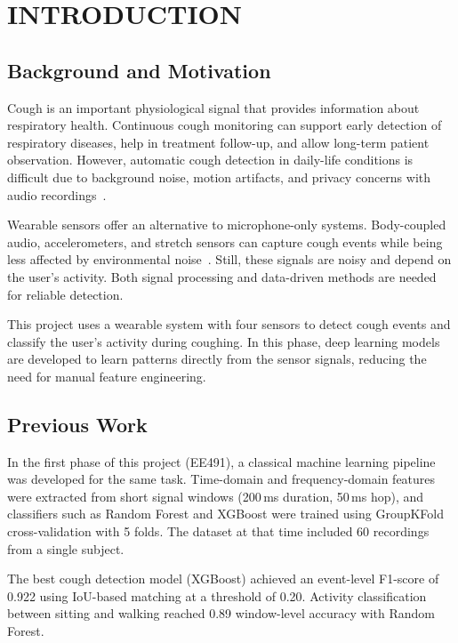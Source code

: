 \chapter{INTRODUCTION}

\section{Background and Motivation}

Cough is an important physiological signal that provides information about respiratory health. Continuous cough monitoring can support early detection of respiratory diseases, help in treatment follow-up, and allow long-term patient observation. However, automatic cough detection in daily-life conditions is difficult due to background noise, motion artifacts, and privacy concerns with audio recordings~\cite{dixon2025}.

Wearable sensors offer an alternative to microphone-only systems. Body-coupled audio, accelerometers, and stretch sensors can capture cough events while being less affected by environmental noise~\cite{elfaramawy2017}. Still, these signals are noisy and depend on the user's activity. Both signal processing and data-driven methods are needed for reliable detection.

This project uses a wearable system with four sensors to detect cough events and classify the user's activity during coughing. In this phase, deep learning models are developed to learn patterns directly from the sensor signals, reducing the need for manual feature engineering.

\section{Previous Work}

In the first phase of this project (EE491), a classical machine learning pipeline was developed for the same task. Time-domain and frequency-domain features were extracted from short signal windows (200\,ms duration, 50\,ms hop), and classifiers such as Random Forest and XGBoost were trained using GroupKFold cross-validation with 5 folds. The dataset at that time included 60 recordings from a single subject.

The best cough detection model (XGBoost) achieved an event-level F1-score of 0.922 using IoU-based matching at a threshold of 0.20. Activity classification between sitting and walking reached 0.89 window-level accuracy with Random Forest.

